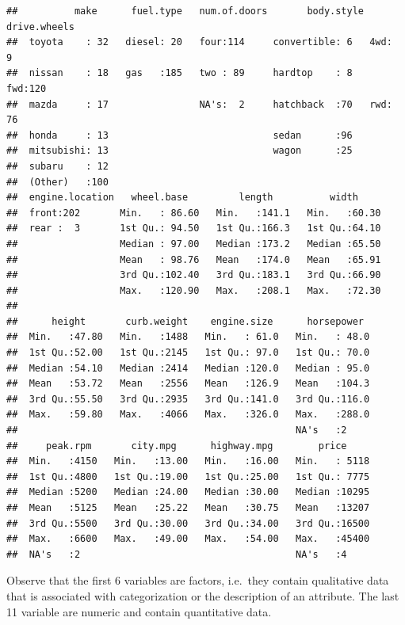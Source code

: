 \documentclass[
]{krantz}
\theoremstyle{definition}
\theoremstyle{definition}
\theoremstyle{definition}
\theoremstyle{remark}
\begin{document}
\begin{verbatim}
##          make      fuel.type   num.of.doors       body.style drive.wheels
##  toyota    : 32   diesel: 20   four:114     convertible: 6   4wd:  9     
##  nissan    : 18   gas   :185   two : 89     hardtop    : 8   fwd:120     
##  mazda     : 17                NA's:  2     hatchback  :70   rwd: 76     
##  honda     : 13                             sedan      :96               
##  mitsubishi: 13                             wagon      :25               
##  subaru    : 12                                                          
##  (Other)   :100                                                          
##  engine.location   wheel.base         length          width      
##  front:202       Min.   : 86.60   Min.   :141.1   Min.   :60.30  
##  rear :  3       1st Qu.: 94.50   1st Qu.:166.3   1st Qu.:64.10  
##                  Median : 97.00   Median :173.2   Median :65.50  
##                  Mean   : 98.76   Mean   :174.0   Mean   :65.91  
##                  3rd Qu.:102.40   3rd Qu.:183.1   3rd Qu.:66.90  
##                  Max.   :120.90   Max.   :208.1   Max.   :72.30  
##                                                                  
##      height       curb.weight    engine.size      horsepower   
##  Min.   :47.80   Min.   :1488   Min.   : 61.0   Min.   : 48.0  
##  1st Qu.:52.00   1st Qu.:2145   1st Qu.: 97.0   1st Qu.: 70.0  
##  Median :54.10   Median :2414   Median :120.0   Median : 95.0  
##  Mean   :53.72   Mean   :2556   Mean   :126.9   Mean   :104.3  
##  3rd Qu.:55.50   3rd Qu.:2935   3rd Qu.:141.0   3rd Qu.:116.0  
##  Max.   :59.80   Max.   :4066   Max.   :326.0   Max.   :288.0  
##                                                 NA's   :2      
##     peak.rpm       city.mpg      highway.mpg        price      
##  Min.   :4150   Min.   :13.00   Min.   :16.00   Min.   : 5118  
##  1st Qu.:4800   1st Qu.:19.00   1st Qu.:25.00   1st Qu.: 7775  
##  Median :5200   Median :24.00   Median :30.00   Median :10295  
##  Mean   :5125   Mean   :25.22   Mean   :30.75   Mean   :13207  
##  3rd Qu.:5500   3rd Qu.:30.00   3rd Qu.:34.00   3rd Qu.:16500  
##  Max.   :6600   Max.   :49.00   Max.   :54.00   Max.   :45400  
##  NA's   :2                                      NA's   :4
\end{verbatim}

Observe that the first 6 variables are factors, i.e.~they contain
qualitative data that is associated with categorization or the
description of an attribute. The last 11 variable are numeric and
contain quantitative data.
\end{document}
